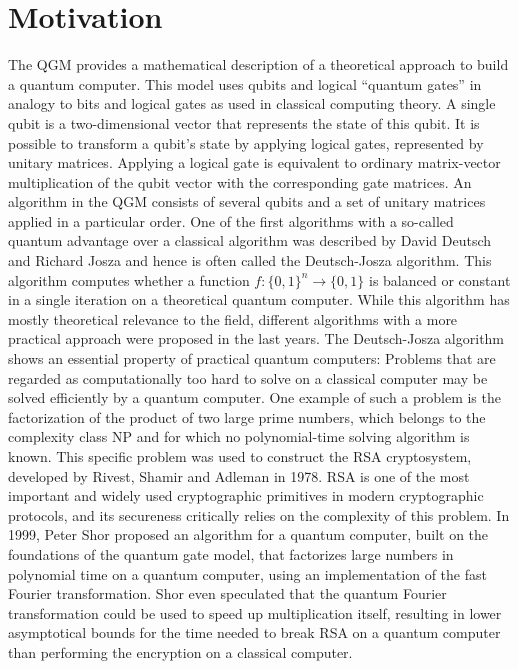 \section{Motivation}
The \ac{QGM} provides a mathematical description of a theoretical approach to build a quantum computer. This model uses qubits and logical ``quantum gates'' in analogy to bits and logical gates as used in classical computing theory. A single qubit is a two-dimensional vector that represents the state of this qubit. It is possible to transform a qubit's state by applying logical gates, represented by unitary matrices. Applying a logical gate is equivalent to ordinary matrix-vector multiplication of the qubit vector with the corresponding gate matrices. An algorithm in the \ac{QGM} consists of several qubits and a set of unitary matrices applied in a particular order. One of the first algorithms with a so-called quantum advantage over a classical algorithm was described by David Deutsch and Richard Josza and hence is often called the Deutsch-Josza algorithm. This algorithm computes whether a function \(f : \{0,1\}^n \rightarrow \{0, 1 \} \) is balanced or constant in a single iteration on a theoretical quantum computer\cite{deutsch1992rapid}. While this algorithm has mostly theoretical relevance to the field, different algorithms with a more practical approach were proposed in the last years. The Deutsch-Josza algorithm shows an essential property of practical quantum computers: Problems that are regarded as computationally too hard to solve on a classical computer may be solved efficiently by a quantum computer. One example of such a problem is the factorization of the product of two large prime numbers, which belongs to the complexity class NP and for which no polynomial-time solving algorithm is known. This specific problem was used to construct the RSA cryptosystem, developed by Rivest, Shamir and Adleman in 1978\cite{rivest1978method}. RSA is one of the most important and widely used cryptographic primitives in modern cryptographic protocols, and its secureness critically relies on the complexity of this problem. In 1999, Peter Shor proposed an algorithm for a quantum computer, built on the foundations of the quantum gate model, that factorizes large numbers in polynomial time on a quantum computer, using an implementation of the fast Fourier transformation. Shor even speculated that the quantum Fourier transformation could be used to speed up multiplication itself, resulting in lower asymptotical bounds for the time needed to break RSA on a quantum computer than performing the encryption on a classical computer.

